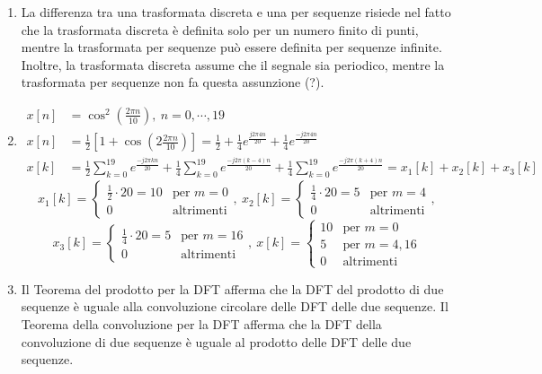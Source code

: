 \documentclass[
]{article}
\begin{document}
\begin{enumerate}
\def\labelenumi{\arabic{enumi}.}
\setcounter{enumi}{21}
\item
  La differenza tra una trasformata discreta e una per sequenze risiede
  nel fatto che la trasformata discreta è definita solo per un numero
  finito di punti, mentre la trasformata per sequenze può essere
  definita per sequenze infinite. Inoltre, la trasformata discreta
  assume che il segnale sia periodico, mentre la trasformata per
  sequenze non fa questa assunzione (?).
\item
  \begin{align*} 
  x[n] &= \cos^2(\frac{2\pi n}{10}), \ n= 0, \cdots, 19 \\
  x[n] &= \frac{1}{2}[1+\cos(2\frac{2\pi n}{10})] = \frac{1}{2} + \frac{1}{4}e^{\frac{j2\pi 4n}{20}} + \frac{1}{4}e^{\frac{-j2\pi 4n}{20}} \\
  x[k] &= \frac{1}{2}\sum_{k=0}^{19} e^{\frac{-j2\pi kn}{20}} + \frac{1}{4}\sum_{k=0}^{19} e^{\frac{-j2\pi (k-4)n}{20}} +\frac{1}{4}\sum_{k=0}^{19} e^{\frac{-j2\pi (k+4)n}{20}} = x_1[k]+x_2[k]+x_3[k]
  \end{align*} \[
  x_{1}[k] = \left\{ \begin{array}{cl}
  \frac{1}{2} \cdot 20 = 10 & \text{per } m=0 \\
  0 & \text{altrimenti}
  \end{array} \right., \
  x_{2}[k] = \left\{ \begin{array}{cl}
  \frac{1}{4} \cdot 20 = 5& \text{per } m=4 \\
  0 & \text{altrimenti}
  \end{array} \right.,
  \] \[
  x_{3}[k] = \left\{ \begin{array}{cl}
  \frac{1}{4} \cdot 20 = 5& \text{per } m=16 \\
  0 & \text{altrimenti}
  \end{array} \right.,\
  x[k] = \left\{ \begin{array}{cl}
  10& \text{per } m=0 \\
  5 & \text{per }m=4, 16\\
  0 & \text{altrimenti}
  \end{array} \right.
  \]
\item
  Il Teorema del prodotto per la DFT afferma che la DFT del prodotto di
  due sequenze è uguale alla convoluzione circolare delle DFT delle due
  sequenze. Il Teorema della convoluzione per la DFT afferma che la DFT
  della convoluzione di due sequenze è uguale al prodotto delle DFT
  delle due sequenze.

\end{enumerate}
\end{document}
